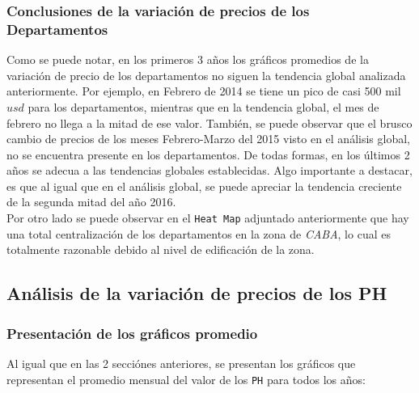 \documentclass[a4paper, 10pt]{article}
\def\code#1{\texttt{#1}}
\newcommand\tab[1][0.5cm]{\hspace*{#1}}
\begin{document}
      \subsubsection{Conclusiones de la variación de precios de los Departamentos}

        \tab Como se puede notar, en los primeros 3 años los gráficos promedios de la variación de precio de los departamentos no siguen la tendencia global analizada anteriormente. Por ejemplo, en Febrero de 2014 se tiene un pico de casi 500 mil $usd$ para los departamentos, mientras que en la tendencia global, el mes de febrero no llega a la mitad de ese valor. También, se puede observar que el brusco cambio de precios de los meses Febrero-Marzo del 2015 visto en el análisis global, no se encuentra presente en los departamentos. De todas formas, en los últimos 2 años se adecua a las tendencias globales establecidas. Algo importante a destacar, es que al igual que en el análisis global, se puede apreciar la tendencia creciente de la segunda mitad del año 2016.
        \\
        \tab Por otro lado se puede observar en el \code{Heat Map} adjuntado anteriormente que hay una total centralización de los departamentos en la zona de \textit{CABA}, lo cual es totalmente razonable debido al nivel de edificación de la zona.


	\subsection{Análisis de la variación de precios de los PH}

  \subsubsection{Presentación de los gráficos promedio}
    \tab Al igual que en las 2 secciónes anteriores, se presentan los gráficos que representan el promedio mensual del valor de los \code{PH} para todos los años:
\end{document}
